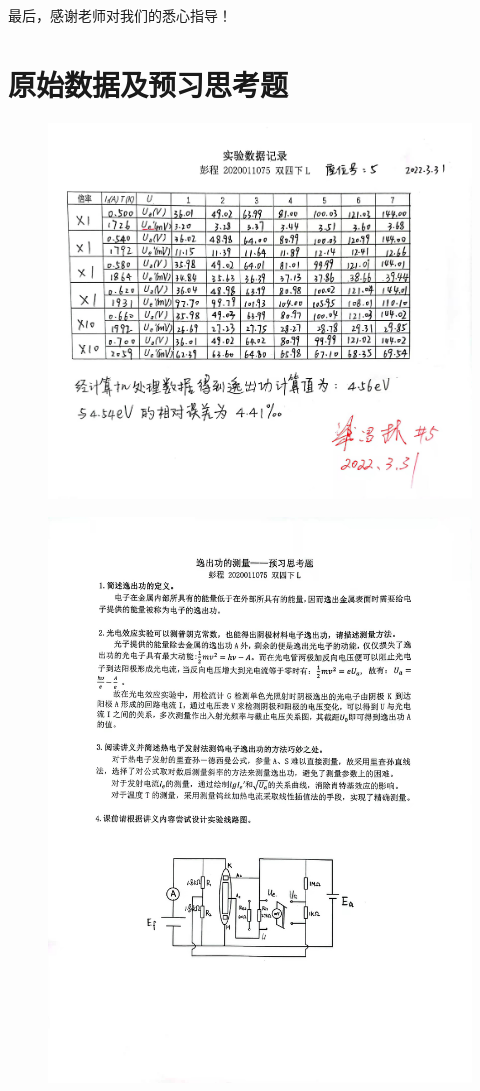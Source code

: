 \documentclass[UTF8]{ctexart}
\begin{document}
最后，感谢老师对我们的悉心指导！

\section{原始数据及预习思考题}

\begin{figure}[H]
  \centering
  \includegraphics[scale=0.13]{数据.jpg}
\end{figure}

\begin{figure}[H]
  \centering
  \includegraphics[scale=0.15]{预习.jpg}
\end{figure}
\end{document}
